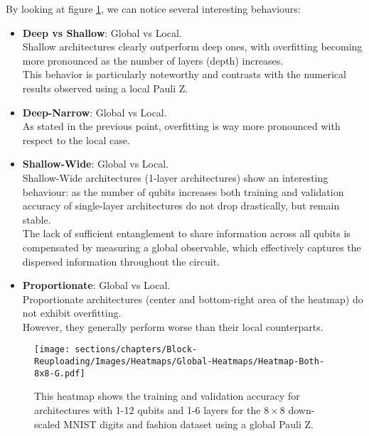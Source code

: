 
By looking at figure \ref{fig:heatmap-8x8-G}, we can notice 
several interesting behaviours:

\begin{itemize}
    \item \textbf{Deep vs Shallow}: Global vs Local.\\
    Shallow architectures clearly outperform deep ones, with overfitting becoming more pronounced 
    as the number of layers (depth) increases.\\
    This behavior is particularly noteworthy and contrasts with the numerical results observed 
    using a local Pauli Z.
    \item \textbf{Deep-Narrow}: Global vs Local.\\
    As stated in the previous point, overfitting is way more pronounced with respect to the local case.
    \item \textbf{Shallow-Wide}: Global vs Local.\\
    Shallow-Wide architectures (1-layer architectures) show an interesting behaviour: as the number of 
    qubits increases both training and validation accuracy of single-layer architectures 
    do not drop drastically, but remain stable.\\
    The lack of sufficient entanglement to share information across all qubits is compensated by 
    measuring a global observable, which effectively captures the dispersed information throughout the 
    circuit.
    \item \textbf{Proportionate}: Global vs Local.\\
    Proportionate architectures (center and bottom-right area of the heatmap) do not exhibit overfitting. \\
    However, they generally perform worse than their local counterparts.
 \end{itemize}


 \begin{figure}[H]
    \centering
    \texttt{[image: sections/chapters/Block-Reuploading/Images/Heatmaps/Global-Heatmaps/Heatmap-Both-8x8-G.pdf]}
    \caption{This heatmap shows the training and validation accuracy for architectures with 1-12 qubits and
    1-6 layers for the $8\times8$ down-scaled MNIST digits and fashion dataset using a global Pauli Z.}
    \label{fig:heatmap-8x8-G}
\end{figure}



